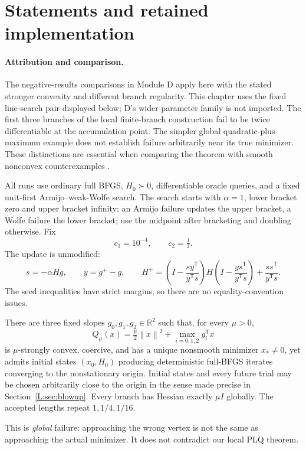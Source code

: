 \begingroup
\providecommand{\R}{}
\renewcommand{\R}{\mathbb R}
\providecommand{\T}{}
\renewcommand{\T}{^{\mathsf T}}
\providecommand{\norm}{}
\renewcommand{\norm}[1]{\left\lVert#1\right\rVert}
\providecommand{\ip}{}
\renewcommand{\ip}[2]{\langle #1,#2\rangle}
\setcounter{section}{0}
\setcounter{theorem}{0}
\setcounter{lemma}{0}
\setcounter{corollary}{0}
\setcounter{proposition}{0}
\setcounter{remark}{0}
\setcounter{equation}{0}
\section{Statements and retained implementation}
\paragraph{Attribution and comparison.}
The negative-results comparisons in Module D apply here with the stated stronger convexity and different branch regularity. This chapter uses the fixed line-search pair displayed below; D's wider parameter family is not imported. The first three branches of the local finite-branch construction fail to be twice differentiable at the accumulation point. The simpler global quadratic-plus-maximum example does not establish failure arbitrarily near its true minimizer. These distinctions are essential when comparing the theorem with smooth nonconvex counterexamples \cite{NEG_M07,NEG_M14,NEG_DIAO26}.

All runs use ordinary full BFGS, $H_0\succ0$, differentiable oracle queries, and a fixed unit-first Armijo--weak-Wolfe search. The search starts with $\alpha=1$, lower bracket zero and upper bracket infinity; an Armijo failure updates the upper bracket, a Wolfe failure the lower bracket; use the midpoint after bracketing and doubling otherwise. Fix
\[
 c_1=10^{-4},\qquad c_2=\tfrac12.
\]
The update is unmodified:
\[
 s=-\alpha Hg,\qquad y=g^+-g,\qquad
 H^+=\left(I-\frac{sy\T}{y\T s}\right)H
 \left(I-\frac{ys\T}{y\T s}\right)+\frac{ss\T}{y\T s}.
\]
The seed inequalities have strict margins, so there are no equality-convention issues.

\begin{theorem}\label{L:thm:global}
There are three fixed slopes $g_0,g_1,g_2\in\R^2$ such that, for every $\mu>0$,
\[
 Q_\mu(x)=\tfrac\mu2\norm{x}^2+\max_{i=0,1,2}g_i\T x
\]
is $\mu$-strongly convex, coercive, and has a unique nonsmooth minimizer $x_*\ne0$, yet admits initial states $(x_0,H_0)$ producing deterministic full-BFGS iterates converging to the nonstationary origin. Initial states and every future trial may be chosen arbitrarily close to the origin in the sense made precise in Section~\ref{L:sec:blowup}. Every branch has Hessian exactly $\mu I$ globally. The accepted lengths repeat $1,1/4,1/16$.
\end{theorem}
\noindent This is \emph{global} failure: approaching the wrong vertex is not the same as approaching the actual minimizer. It does not contradict our local PLQ theorem.

